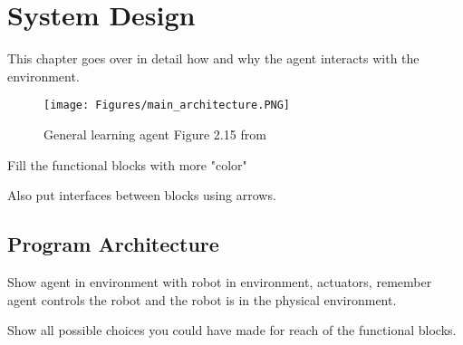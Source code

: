 \chapter{System Design} 
\label{chapter:System_Design}











This chapter goes over in detail how and why the agent interacts with the environment. 


\begin{figure}[H]
    \centering
    \texttt{[image: Figures/main\_architecture.PNG]}
    \caption{General learning agent Figure 2.15 from \cite{russell2016artificial}} 
    \label{fig:agent}
\end{figure}

Fill the functional blocks with more "color"

Also put interfaces between blocks using arrows.

\section{Program Architecture}

Show agent in environment with robot in environment, actuators, remember agent controls the robot and the robot is in the physical environment.

Show all possible choices you could have made for reach of the functional blocks.

